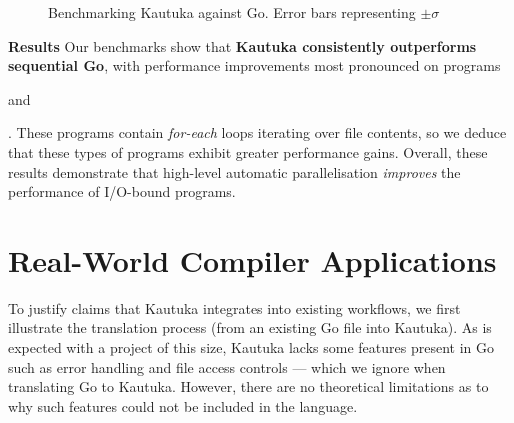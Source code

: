 \begin{figure}[!h]
  \label{fig:4.2}
  \vspace{-0.5mm}\caption{Benchmarking Kautuka against Go. Error bars representing \( \pm \sigma \)}
\end{figure}

\newpage 

\textbf{Results} Our benchmarks show that \textbf{Kautuka consistently outperforms sequential Go}, with performance improvements most pronounced on programs  and . These programs contain \textit{for-each} loops iterating over file contents, so we deduce that these types of programs exhibit greater performance gains. Overall, these results demonstrate that high-level automatic parallelisation \textit{improves} the performance of I/O-bound programs.


\section{Real-World Compiler Applications}

\label{sec:4.4}

To justify claims that Kautuka integrates into existing workflows, we first illustrate the translation process (from an existing Go file into Kautuka). As is expected with a project of this size, Kautuka lacks some features present in Go such as error handling and file access controls --- which we ignore when translating Go to Kautuka. However, there are no theoretical limitations as to why such features could not be included in the language.

